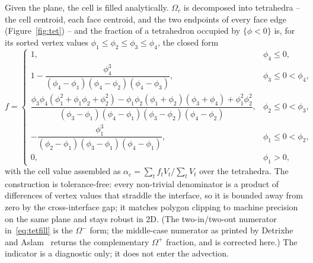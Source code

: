 \documentclass[preprint,3p,11pt]{elsarticle}
\begin{document}
Given the plane, the cell is filled analytically. $\Omega_c$ is decomposed into
tetrahedra -- the cell centroid, each face centroid, and the two endpoints of every face
edge (Figure~\ref{fig:tet}) -- and the fraction of a tetrahedron occupied by
$\{\phi<0\}$ is, for its sorted vertex values
$\phi_1\!\le\!\phi_2\!\le\!\phi_3\!\le\!\phi_4$, the closed form~\cite{detrixhe2016}
\begin{equation}
  f =
  \begin{cases}
    1, & \phi_4\le 0,\\[4pt]
    1-\dfrac{\phi_4^{3}}{(\phi_4-\phi_1)(\phi_4-\phi_2)(\phi_4-\phi_3)},
      & \phi_3\le 0<\phi_4,\\[10pt]
    \dfrac{\phi_3\phi_4(\phi_1^2+\phi_1\phi_2+\phi_2^2)
           -\phi_1\phi_2(\phi_1+\phi_2)(\phi_3+\phi_4)+\phi_1^2\phi_2^2}
          {(\phi_3-\phi_1)(\phi_4-\phi_1)(\phi_3-\phi_2)(\phi_4-\phi_2)},
      & \phi_2\le 0<\phi_3,\\[12pt]
    -\dfrac{\phi_1^{3}}{(\phi_2-\phi_1)(\phi_3-\phi_1)(\phi_4-\phi_1)},
      & \phi_1\le 0<\phi_2,\\[6pt]
    0, & \phi_1>0,
  \end{cases}
  \label{eq:tetfill}
\end{equation}
with the cell value assembled as $\alpha_c=\sum_t f_t V_t\big/\sum_t V_t$ over the
tetrahedra. The construction is tolerance-free: every non-trivial denominator is a
product of differences of vertex values that straddle the interface, so it is bounded
away from zero by the cross-interface gap; it matches polygon clipping to machine
precision on the same plane and stays robust in 2D. (The two-in/two-out numerator
in~\eqref{eq:tetfill} is the $\Omega^-$ form; the middle-case numerator as printed by
Detrixhe and Aslam~\cite{detrixhe2016} returns the complementary $\Omega^+$ fraction,
and is corrected here.) The indicator is a diagnostic
only; it does not enter the advection.
\end{document}
